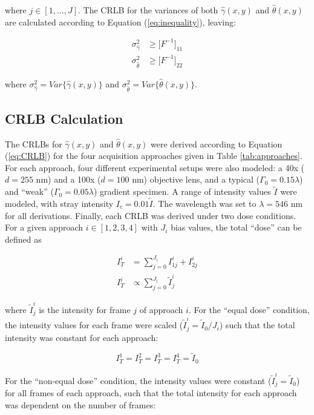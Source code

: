 \documentclass[aps, secnumarabic, amssymb, notitlepage]{article}
\begin{document}
\noindent where $j \in [1,...,J]$. The CRLB for the variances of both $\hat{\gamma}(x,y)$ and $\hat{\theta}(x,y)$ are calculated according to Equation (\ref{eq:inequality}), leaving: 

\begin{align}
\nonumber  \sigma_{\hat{\gamma}}^2 &\ge \big[ F^{-1}\big]_{11}\\[6pt]
  \sigma_{\hat{\theta}}^2 &\ge \big[ F^{-1}\big]_{22}
                            \label{eq:CRLB}
\end{align}

\noindent where $\sigma_{\hat{\gamma}}^2 = Var\{\hat{\gamma}(x,y)\}$ and $\sigma_{\hat{\theta}}^2 = Var\{\hat{\theta}(x,y)\}$. 

\subsection{CRLB Calculation}

The CRLBs for $\hat{\gamma}(x,y)$ and $\hat{\theta}(x,y)$ were derived according to Equation (\ref{eq:CRLB}) for the four acquisition approaches given in Table \ref{tab:approaches}. For each approach, four different experimental setups were also modeled: a 40x ($d = 255$ nm) and a 100x ($d = 100$ nm) objective lens, and a typical ($\Gamma_0 = 0.15\lambda$) and ``weak'' ($\Gamma_0 = 0.05\lambda$) gradient specimen. A range of intensity values $\tilde{I}$ were modeled, with stray intensity $I_c = 0.01 \tilde{I}$. The wavelength was set to $\lambda = 546$ nm for all derivations. Finally, each CRLB was derived under two dose conditions. For a given approach $i \in [1,2,3,4]$ with $J_i$ bias values, the total ``dose'' can be defined as

\begin{align*}
  I^i_T &= \sum_{j=0}^{J_i} I^i_{1j} + I^i_{2j} \\
  I^i_T &\propto \sum_{j=0}^{J_i} \tilde{I}^i_j
\end{align*}

\noindent where $\tilde{I}^i_j$ is the intensity for frame $j$ of approach $i$. For the ``equal dose'' condition, the intensity values for each frame were scaled ($\tilde{I}^i_j = \tilde{I}_0 / J_i$) such that the total intensity was constant for each approach:

\begin{equation*}
  I^1_T = I^2_T = I^3_T = I^4_T = \tilde{I}_0
\end{equation*}

For the ``non-equal dose'' condition, the intensity values were constant ($\tilde{I}^i_j = \tilde{I}_0$) for all frames of each approach, such that the total intensity for each approach was dependent on the number of frames:
\end{document}
